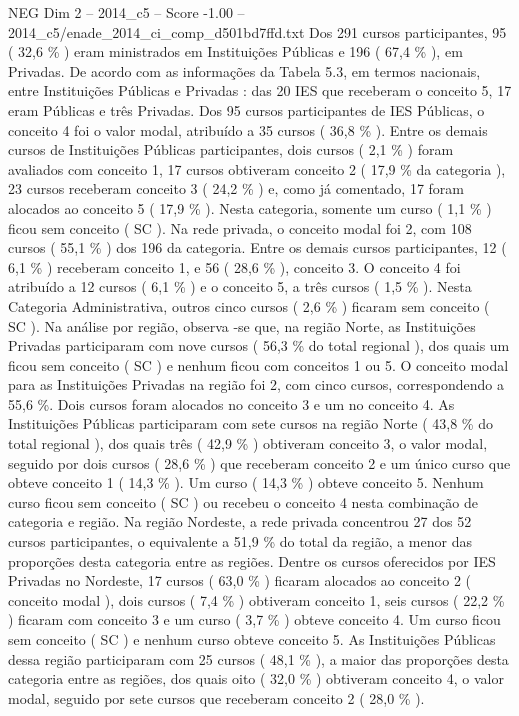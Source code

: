 \begin{textsample}{NEG Dim 2 – 2014\_c5 – Score -1.00 – 2014\_c5/enade\_2014\_ci\_comp\_d501bd7ffd.txt}
Dos 291 cursos participantes, 95 ( 32,6 \% ) eram ministrados em Instituições Públicas e 196 ( 67,4 \% ), em Privadas.
De acordo com as informações da Tabela 5.3, em termos nacionais, entre Instituições Públicas e Privadas : das 20 IES que receberam o conceito 5, 17 eram Públicas e três Privadas.
Dos 95 cursos participantes de IES Públicas, o conceito 4 foi o valor modal, atribuído a 35 cursos ( 36,8 \% ).
Entre os demais cursos de Instituições Públicas participantes, dois cursos ( 2,1 \% ) foram avaliados com conceito 1, 17 cursos obtiveram conceito 2 ( 17,9 \% da categoria ), 23 cursos receberam conceito 3 ( 24,2 \% ) e, como já comentado, 17 foram alocados ao conceito 5 ( 17,9 \% ).
Nesta categoria, somente um curso ( 1,1 \% ) ficou sem conceito ( SC ).
Na rede privada, o conceito modal foi 2, com 108 cursos ( 55,1 \% ) dos 196 da categoria.
Entre os demais cursos participantes, 12 ( 6,1 \% ) receberam conceito 1, e 56 ( 28,6 \% ), conceito 3.
O conceito 4 foi atribuído a 12 cursos ( 6,1 \% ) e o conceito 5, a três cursos ( 1,5 \% ).
Nesta Categoria Administrativa, outros cinco cursos ( 2,6 \% ) ficaram sem conceito ( SC ).
Na análise por região, observa -se que, na região Norte, as Instituições Privadas participaram com nove cursos ( 56,3 \% do total regional ), dos quais um ficou sem conceito ( SC ) e nenhum ficou com conceitos 1 ou 5.
O conceito modal para as Instituições Privadas na região foi 2, com cinco cursos, correspondendo a 55,6 \%.
Dois cursos foram alocados no conceito 3 e um no conceito 4.
As Instituições Públicas participaram com sete cursos na região Norte ( 43,8 \% do total regional ), dos quais três ( 42,9 \% ) obtiveram conceito 3, o valor modal, seguido por dois cursos ( 28,6 \% ) que receberam conceito 2 e um único curso que obteve conceito 1 ( 14,3 \% ).
Um curso ( 14,3 \% ) obteve conceito 5.
Nenhum curso ficou sem conceito ( SC ) ou recebeu o conceito 4 nesta combinação de categoria e região.
Na região Nordeste, a rede privada concentrou 27 dos 52 cursos participantes, o equivalente a 51,9 \% do total da região, a menor das proporções desta categoria entre as regiões.
Dentre os cursos oferecidos por IES Privadas no Nordeste, 17 cursos ( 63,0 \% ) ficaram alocados ao conceito 2 ( conceito modal ), dois cursos ( 7,4 \% ) obtiveram conceito 1, seis cursos ( 22,2 \% ) ficaram com conceito 3 e um curso ( 3,7 \% ) obteve conceito 4.
Um curso ficou sem conceito ( SC ) e nenhum curso obteve conceito 5.
As Instituições Públicas dessa região participaram com 25 cursos ( 48,1 \% ), a maior das proporções desta categoria entre as regiões, dos quais oito ( 32,0 \% ) obtiveram conceito 4, o valor modal, seguido por sete cursos que receberam conceito 2 ( 28,0 \% ).

\end{textsample}
